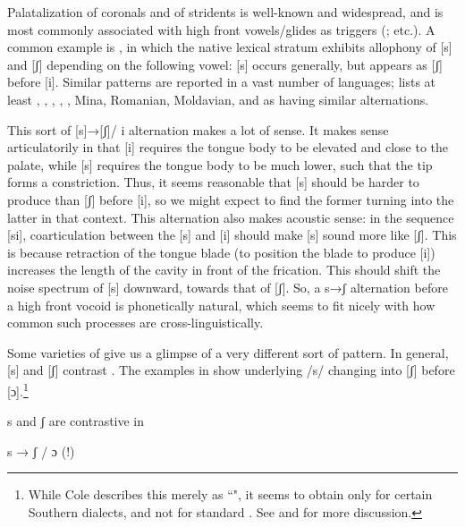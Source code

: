 Palatalization of coronals and of stridents is well-known and widespread, and is most commonly associated with high front vowels/glides as triggers (\citealt{Bateman:2007aa,Bateman2010,Kochetov2011}; etc.). A common example is , in which the native lexical stratum exhibits allophony of [s] and [ʃ] depending on the following vowel: [s] occurs generally, but appears as [ʃ] before [i]. Similar patterns are reported in a vast number of languages; \citet{Bateman:2007aa} lists at least , , ,  , , Mina, Romanian, Moldavian, and  as having similar alternations. 

This sort of [s]→[ʃ]/ {\longrule} i alternation makes a lot of sense. It makes sense articulatorily in that [i] requires the tongue body to be elevated and close to the palate, while [s] requires the tongue body to be much lower, such that the tip forms a constriction. Thus, it seems reasonable that [s] should be harder to produce than [ʃ] before [i], so we might expect to find the former turning into the latter in that context. This alternation also makes acoustic sense: in the sequence [si], coarticulation between the [s] and [i] should make [s] sound more like [ʃ]. This is because retraction of the tongue blade (to position the blade to produce [i]) increases the length of the cavity in front of the frication. This should shift the noise spectrum of [s] downward, towards that of [ʃ]. So, a s→ʃ alternation before a high front vocoid is phonetically natural, which seems to fit nicely with how common such processes are cross-linguistically.

Some varieties of  give us a glimpse of a very different sort of pattern. In general, [s] and [ʃ] contrast . The examples in  \citep[from][]{Cole1955} show underlying /s/ changing into [ʃ] before [ɔ].\footnote{While Cole describes this merely as ``", it seems to obtain only for certain Southern dialects, and not for standard . See  and  for more discussion.}

\ea\label{ex:bennett:1}
s and ʃ are contrastive in  \citep[25]{Cole1955}\\
\z

\ea\label{ex:bennett:2}
s → ʃ / {\longrule} ɔ (!)
\ea\label{ex:bennett:2a}
\ex\label{ex:bennett:2b} 
\ex\label{ex:bennett:2c} 
\z
\z

